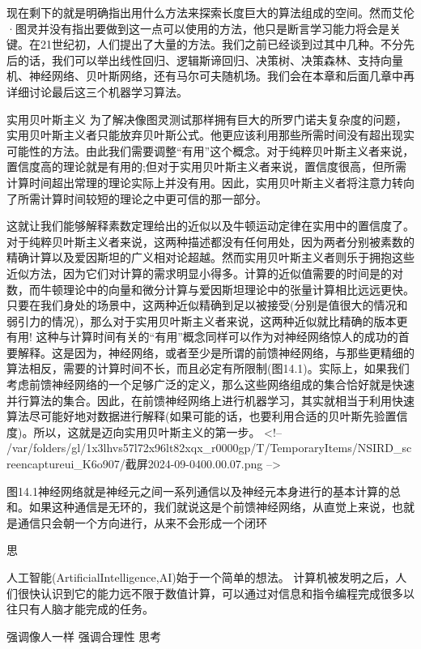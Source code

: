 现在剩下的就是明确指出用什么方法来探索长度巨大的算法组成的空间。然而艾伦·图灵并没有指出要做到这一点可以使用的方法，他只是断言学习能力将会是关键。在21世纪初，人们提出了大量的方法。我们之前已经谈到过其中几种。不分先后的话，我们可以举出线性回归、逻辑斯谛回归、决策树、决策森林、支持向量机、神经网络、贝叶斯网络，还有马尔可夫随机场。我们会在本章和后面几章中再详细讨论最后这三个机器学习算法。

实用贝叶斯主义
为了解决像图灵测试那样拥有巨大的所罗门诺夫复杂度的问题，实用贝叶斯主义者只能放弃贝叶斯公式。他更应该利用那些所需时间没有超出现实可能性的方法。由此我们需要调整“有用”这个概念。对于纯粹贝叶斯主义者来说，置信度高的理论就是有用的;但对于实用贝叶斯主义者来说，置信度很高，但所需计算时间超出常理的理论实际上并没有用。因此，实用贝叶斯主义者将注意力转向了所需计算时间较短的理论之中更可信的那一部分。

这就让我们能够解释素数定理给出的近似以及牛顿运动定律在实用中的置信度了。对于纯粹贝叶斯主义者来说，这两种描述都没有任何用处，因为两者分别被素数的精确计算以及爱因斯坦的广义相对论超越。然而实用贝叶斯主义者则乐于拥抱这些近似方法，因为它们对计算的需求明显小得多。计算的近似值需要的时间是的对数，而牛顿理论中的向量和微分计算与爱因斯坦理论中的张量计算相比远远更快。只要在我们身处的场景中，这两种近似精确到足以被接受(分别是值很大的情况和弱引力的情况)，那么对于实用贝叶斯主义者来说，这两种近似就比精确的版本更有用!
这种与计算时间有关的“有用”概念同样可以作为对神经网络惊人的成功的首要解释。这是因为，神经网络，或者至少是所谓的前馈神经网络，与那些更精细的算法相反，需要的计算时间不长，而且必定有所限制(图14.1)。实际上，如果我们考虑前馈神经网络的一个足够广泛的定义，那么这些网络组成的集合恰好就是快速并行算法的集合。因此，在前馈神经网络上进行机器学习，其实就相当于利用快速算法尽可能好地对数据进行解释(如果可能的话，也要利用合适的贝叶斯先验置信度)。所以，这就是迈向实用贝叶斯主义的第一步。
<!-- /var/folders/gl/1x3lhvs57l72x96lt82xqx_r0000gp/T/TemporaryItems/NSIRD_screencaptureui_K6o907/截屏2024-09-0400.00.07.png -->

图14.1神经网络就是神经元之间一系列通信以及神经元本身进行的基本计算的总和。如果这种通信是无环的，我们就说这是个前馈神经网络，从直觉上来说，也就是通信只会朝一个方向进行，从来不会形成一个闭环



思



人工智能(ArtificialIntelligence,AI)始于一个简单的想法。
计算机被发明之后，人们很快认识到它的能力远不限于数值计算，可以通过对信息和指令编程完成很多以往只有人脑才能完成的任务。


强调像人一样
强调合理性
思考

